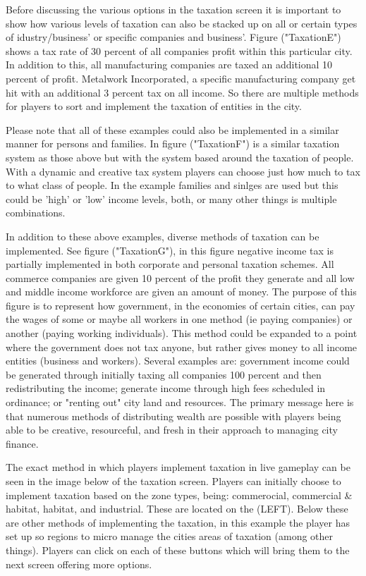 Before discussing the various options in the taxation screen it is important to show how various levels of taxation can also be stacked up on all or certain types of idustry/business' or specific companies and business'.
Figure ("TaxationE") shows a tax rate of 30 percent of all companies profit within this particular city. In addition to this, all manufacturing companies are taxed an additional 10 percent of profit. Metalwork Incorporated, a specific manufacturing company get hit with an additional 3 percent tax on all income. So there are multiple methods for players to sort and implement the taxation of entities in the city. 

Please note that all of these examples could also be implemented in a similar manner for persons and families. In figure ("TaxationF") is a similar taxation system as those above but with the system based around the taxation of people. With a dynamic and creative tax system players can choose just how much to tax to what class of people. In the example families and sinlges are used but this could be 'high' or 'low' income levels, both, or many other things is multiple combinations.

In addition to these above examples, diverse methods of taxation can be implemented. See figure ("TaxationG"), in this figure negative income tax is partially implemented in both corporate and personal taxation schemes. All commerce companies are given 10 percent of the profit they generate and all low and middle income workforce are given an amount of money. The purpose of this figure is to represent how government, in the economies of certain cities, can pay the wages of some or maybe all workers in one method (ie paying companies) or another (paying working individuals). This method could be expanded to a point where the government does not tax anyone, but rather gives money to all income entities (business and workers). Several examples are: government income could be generated through initially taxing all companies 100 percent and then redistributing the income; generate income through high fees scheduled in ordinance; or "renting out" city land and resources. The primary message here is that numerous methods of distributing wealth are possible with players being able to be creative, resourceful, and fresh in their approach to managing city finance.


The exact method in which players implement taxation in live gameplay can be seen in the image below of the taxation screen.
Players can initially choose to implement taxation based on the zone types, being: commerocial, commercial &  habitat, habitat, and industrial. These are located on the (LEFT). Below these are other methods of implementing the taxation, in this example the player has set up so regions to micro manage the cities areas of taxation (among other things). Players can click on each of these buttons which will bring them to the next screen offering more options. 

